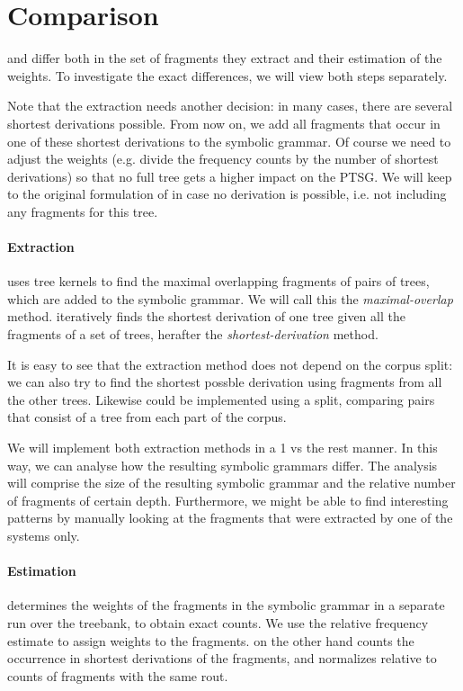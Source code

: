 
\section{Comparison} \label{sec:Comparison}
\dops{} and \ddop{} differ both in the set of fragments they extract and their estimation of the weights. To investigate the exact differences, we will view both steps separately.

Note that the \dops{} extraction needs another decision: in many cases, there are several shortest derivations possible. From now on, we add all fragments that occur in one of these shortest derivations to the symbolic grammar. Of course we need to adjust the weights (e.g. divide the frequency counts by the number of shortest derivations) so that no full tree gets a higher impact on the PTSG. We will keep to the original formulation of \dops{} in case no derivation is possible, i.e. not including any fragments for this tree.

\paragraph{Extraction}
\ddop{} uses tree kernels to find the maximal overlapping fragments of pairs of trees, which are added to the symbolic grammar. We will call this the \emph{maximal-overlap} method. \dops{} iteratively finds the shortest derivation of one tree given all the fragments of a set of trees, herafter the \emph{shortest-derivation} method. 

It is easy to see that the \dops{} extraction method does not depend on the corpus split: we can also try to find the shortest possble derivation using fragments from all the other trees. Likewise \ddop{} could be implemented using a split, comparing pairs that consist of a tree from each part of the corpus. 

We will implement both extraction methods in a 1 vs the rest manner. In this way, we can analyse how the resulting symbolic grammars differ. The analysis will comprise the size of the resulting symbolic grammar and the relative number of fragments of certain depth. Furthermore, we might be able to find interesting patterns by manually looking at the fragments that were extracted by one of the systems only.

\paragraph{Estimation}
\ddop{} determines the weights of the fragments in the symbolic grammar in a separate run over the treebank, to obtain exact counts. We use the relative frequency estimate to assign weights to the fragments. \dops{} on the other hand counts the occurrence in shortest derivations of the fragments, and normalizes relative to counts of fragments with the same rout.

